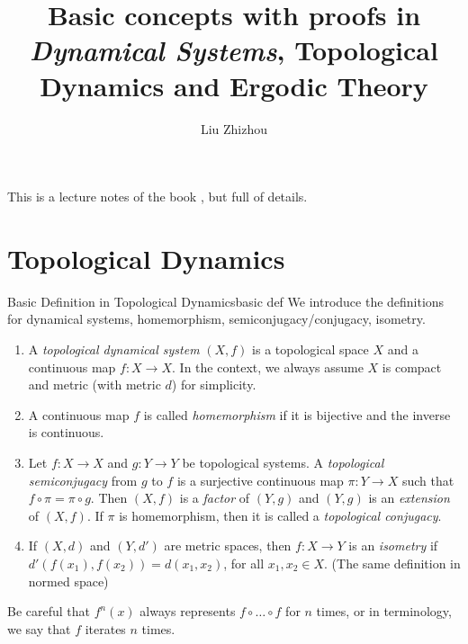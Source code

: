\documentclass[12pt,a4paper]{article}
\author{Liu Zhizhou}
\title{Basic concepts with proofs in \emph{Dynamical Systems}, Topological Dynamics and Ergodic Theory}
\begin{document}
	\maketitle
	
	This is a lecture notes of the book \cite{brin2002introduction}, but full of details.
	
	\tableofcontents
	
	\newcommand{\N}{\mathbb{N}}
	\newcommand{\frakC}{\mathfrak{C}}
	
	
	
	
	\section{Topological Dynamics}
	\begin{definition}{Basic Definition in Topological Dynamics}{basic def}
		We introduce the definitions for dynamical systems, homemorphism, semiconjugacy/conjugacy, isometry.
		\begin{enumerate}
			\item A \emph{topological dynamical system} $(X,f)$ is a topological space $X$ and a continuous map $f:X\rightarrow X$. In the context, we always assume $X$ is compact and metric (with metric $d$) for simplicity.
			\item A continuous map $f$ is called \emph{homemorphism} if it is bijective and the inverse is continuous.
			\item Let $f:X\rightarrow X$ and $g:Y\rightarrow Y$ be  topological systems. A \emph{topological semiconjugacy} from $g$ to $f$ is a surjective continuous map $\pi:Y\rightarrow X$ such that $f\circ \pi = \pi \circ g$. Then $(X,f)$ is a \emph{factor} of $(Y,g)$ and $(Y,g)$ is an \emph{extension} of $(X,f)$. If $\pi$ is homemorphism, then it is called a \emph{topological conjugacy}. 	
			\item If $(X,d)$ and $(Y,d')$ are metric spaces, then $f:X\rightarrow Y$ is an \emph{isometry} if $d'(f(x_1),f(x_2))=d(x_1,x_2)$, for all $x_1,x_2\in X$. (The same definition in normed space)
		\end{enumerate}
	\end{definition}
	Be careful that $f^n(x)$ always represents $f\circ\dots\circ f$ for $n$ times, or in terminology, we say that $f$ iterates $n$ times.
	
\end{document}
